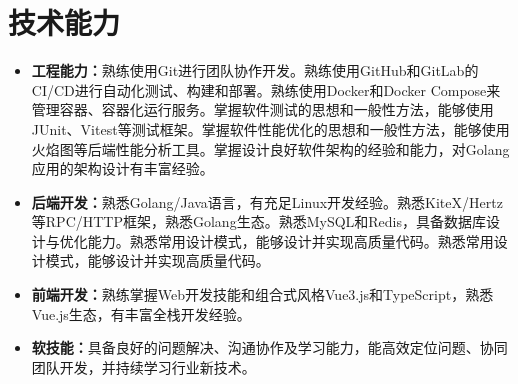 \documentclass{style/template}
\begin{document}
\section{技术能力}

\begin{itemize}
    \item \textbf{工程能力：}熟练使用Git进行团队协作开发。熟练使用GitHub和GitLab的CI/CD进行自动化测试、构建和部署。熟练使用Docker和Docker Compose来管理容器、容器化运行服务。掌握软件测试的思想和一般性方法，能够使用JUnit、Vitest等测试框架。掌握软件性能优化的思想和一般性方法，能够使用火焰图等后端性能分析工具。掌握设计良好软件架构的经验和能力，对Golang应用的架构设计有丰富经验。
    \item \textbf{后端开发：}熟悉Golang/Java语言，有充足Linux开发经验。熟悉KiteX/Hertz等RPC/HTTP框架，熟悉Golang生态。熟悉MySQL和Redis，具备数据库设计与优化能力。熟悉常用设计模式，能够设计并实现高质量代码。熟悉常用设计模式，能够设计并实现高质量代码。
    \item \textbf{前端开发：}熟练掌握Web开发技能和组合式风格Vue3.js和TypeScript，熟悉Vue.js生态，有丰富全栈开发经验。
    \item \textbf{软技能：}具备良好的问题解决、沟通协作及学习能力，能高效定位问题、协同团队开发，并持续学习行业新技术。
\end{itemize}
\end{document}
